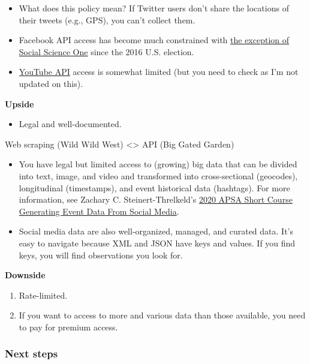 \documentclass[
]{book}
\providecommand{\tightlist}{%
  \setlength{\itemsep}{0pt}\setlength{\parskip}{0pt}}
\begin{document}
\begin{itemize}
\item
  What does this policy mean? If Twitter users don't share the locations of their tweets (e.g., GPS), you can't collect them.
\item
  Facebook API access has become much constrained with \href{https://socialscience.one/blog/unprecedented-facebook-urls-dataset-now-available-research-through-social-science-one}{the exception of Social Science One} since the 2016 U.S. election.
\item
  \href{https://developers.google.com/youtube/v3}{YouTube API} access is somewhat limited (but you need to check as I'm not updated on this).
\end{itemize}

\textbf{Upside}

\begin{itemize}
\tightlist
\item
  Legal and well-documented.
\end{itemize}

Web scraping (Wild Wild West) \textless\textgreater{} API (Big Gated Garden)

\begin{itemize}
\item
  You have legal but limited access to (growing) big data that can be divided into text, image, and video and transformed into cross-sectional (geocodes), longitudinal (timestamps), and event historical data (hashtags). For more information, see Zachary C. Steinert-Threlkeld's \href{https://github.com/ZacharyST/APSA2020_EventDataFromSocialMedia}{2020 APSA Short Course Generating Event Data From Social Media}.
\item
  Social media data are also well-organized, managed, and curated data. It's easy to navigate because XML and JSON have keys and values. If you find keys, you will find observations you look for.
\end{itemize}

\textbf{Downside}

\begin{enumerate}
\def\labelenumi{\arabic{enumi}.}
\item
  Rate-limited.
\item
  If you want to access to more and various data than those available, you need to pay for premium access.
\end{enumerate}

\hypertarget{next-steps}{%
\subsubsection{Next steps}\label{next-steps}}
\end{document}

